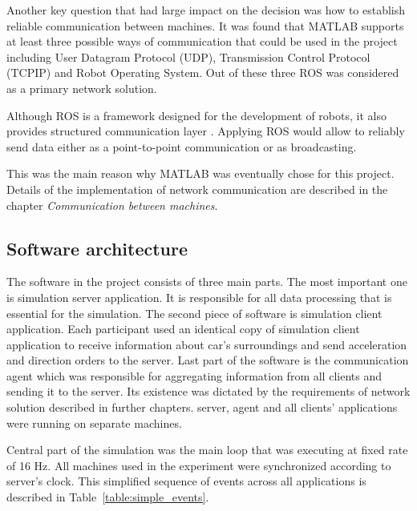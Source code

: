 \documentclass[11pt,english,twoside]{article}
\begin{document}
\par

Another key question that had large impact on the decision was how to establish reliable communication between machines. It was found that MATLAB supports at least three possible ways of communication that could be used in the project including User Datagram Protocol (UDP), Transmission Control Protocol (TCPIP) and Robot Operating System. Out of these three ROS was considered as a primary network solution.

\par
Although ROS is a framework designed for the development of robots, it also provides structured communication layer \citep{quigley2009ros}. Applying ROS would allow to reliably send data either as a point-to-point communication or as broadcasting.

\par
 This was the main reason why MATLAB was eventually chose for this project.
Details of the implementation of network communication are described in the chapter \textit{Communication between machines}.




\subsection{Software architecture}

The software in the project consists of three  main parts. The most important one is simulation server application. It is responsible for all data processing that is essential for the simulation. The second piece of software is simulation client application. Each participant used an identical copy of simulation client application to receive information about car's surroundings and send acceleration and direction orders to the server. Last part of the software is the communication agent which was responsible for aggregating information from all clients and sending it to the server. Its existence was dictated by the requirements of network solution described in further chapters. server, agent and all clients' applications were running on separate machines.
\par
Central part of the simulation was the main loop that was executing at fixed rate of 16 Hz. All machines used in the experiment were synchronized according to server's clock. This simplified sequence of events across all applications is described in Table~\ref{table:simple_events}.

\par
\end{document}
